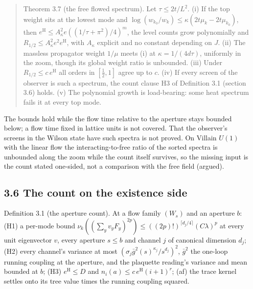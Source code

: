 \documentclass[10pt,letterpaper,twocolumn]{article}
\begin{document}
\begin{quote}
Theorem 3.7 (the free flowed spectrum). Let \(\tau\le2t/L^2\). (i) If the top weight sits at the lowest mode and \(\log(w_{k_0}/w_k)\le\kappa(2t\mu_k-2t\mu_{k_0})\), then \(e^{\mathrm H}\le A_\kappa^2e((1/\tau+\pi^2)/4)^m\), the level counts grow polynomially and \(R_{1/2}\le A_\kappa^2e^2e^{\mathrm H}\), with \(A_\kappa\) explicit and no constant depending on \(J\). (ii) The massless propagator weight \(1/\mu\) meets (i) at \(\kappa=1/(4d\tau)\), uniformly in the zoom, though its global weight ratio is unbounded. (iii) Under \(R_{1/2}\le c\,e^{\mathrm H}\) all orders in \([\tfrac12,1]\) agree up to \(c\). (iv) If every screen of the observer is such a spectrum, the count clause H3 of Definition 3.1 (section 3.6) holds. (v) The polynomial growth is load-bearing: some heat spectrum fails it at every top mode.
\end{quote}

The bounds hold while the flow time relative to the aperture stays bounded below; a flow time fixed in lattice units is not covered. That the observer's screens in the Wilson state have such spectra is not proved. On Villain \(U(1)\) with the linear flow the interacting-to-free ratio of the sorted spectra is unbounded along the zoom while the count itself survives, so the missing input is the count stated one-sided, not a comparison with the free field (argued).

\subsection{3.6 The count on the existence side}\label{36-the-count-on-the-existence-side}

Definition 3.1 (the aperture count). At a flow family \((W_s)\) and an aperture \(b\): (H1) a per-mode bound \(\nu_k((\sum_yv_yF_y)^{2p})\le((2p)!)^{\lceil d_j/4\rceil}(C\lambda)^p\) at every unit eigenvector \(v\), every aperture \(s\le b\) and channel \(j\) of canonical dimension \(d_j\); (H2) every channel's variance at most \((\sigma_j\bar g^2(s)^{\kappa_j}/s^{d_j})^2\), \(\bar g^2\) the one-loop running coupling at the aperture, and the plaquette reading's variance and mean bounded at \(b\); (H3) \(e^{\mathrm H}\le D\) and \(n_i(a)\le c\,e^{\mathrm H}(i+1)^r\); (af) the trace kernel settles onto its tree value times the running coupling squared.
\end{document}
